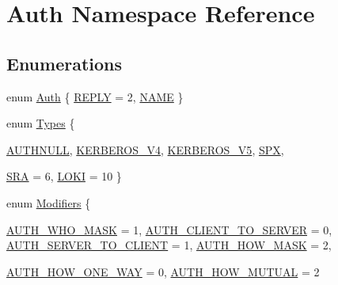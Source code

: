 \hypertarget{namespaceAuth}{
\section{Auth Namespace Reference}
\label{namespaceAuth}
}
\subsection*{Enumerations}
\begin{DoxyCompactItemize}
\item 
enum \hyperlink{namespaceAuth_afd018dc169d551ab60f568415d4921c2}{Auth} \{ \hyperlink{namespaceAuth_afd018dc169d551ab60f568415d4921c2aad7a8ddf26afce2091559ecae21510da}{REPLY} =  2, 
\hyperlink{namespaceAuth_afd018dc169d551ab60f568415d4921c2a3b1ba61eee071c160239eeabad27454e}{NAME}
 \}
\item 
enum \hyperlink{namespaceAuth_a1c36f40c81a9e19a221b5d47e3fbc551}{Types} \{ \par
\hyperlink{namespaceAuth_a1c36f40c81a9e19a221b5d47e3fbc551ad74b9514eeadcd617531bd2691a20bd7}{AUTHNULL}, 
\hyperlink{namespaceAuth_a1c36f40c81a9e19a221b5d47e3fbc551ae26a680fd92093c2b1a800292f1bfb72}{KERBEROS\_\-V4}, 
\hyperlink{namespaceAuth_a1c36f40c81a9e19a221b5d47e3fbc551af86dcb125492557e7dadb2b1495699c4}{KERBEROS\_\-V5}, 
\hyperlink{namespaceAuth_a1c36f40c81a9e19a221b5d47e3fbc551aad89a28d0b5b57b8ae6588c42cc81714}{SPX}, 
\par
\hyperlink{namespaceAuth_a1c36f40c81a9e19a221b5d47e3fbc551a20c2452dafb0603c2def0269060902cc}{SRA} =  6, 
\hyperlink{namespaceAuth_a1c36f40c81a9e19a221b5d47e3fbc551a62e2242bf7aaf7426a03d94d91448b02}{LOKI} =  10
 \}
\item 
enum \hyperlink{namespaceAuth_ad9d52fb54042db8f44db17f33e657f94}{Modifiers} \{ \par
\hyperlink{namespaceAuth_ad9d52fb54042db8f44db17f33e657f94af2e63729a492f22a97719608fd1e5b05}{AUTH\_\-WHO\_\-MASK} =  1, 
\hyperlink{namespaceAuth_ad9d52fb54042db8f44db17f33e657f94a7b330a0f682a0358fe6242de42291994}{AUTH\_\-CLIENT\_\-TO\_\-SERVER} =  0, 
\hyperlink{namespaceAuth_ad9d52fb54042db8f44db17f33e657f94ad80fdb68fce15452e1eaa3e01005b371}{AUTH\_\-SERVER\_\-TO\_\-CLIENT} =  1, 
\hyperlink{namespaceAuth_ad9d52fb54042db8f44db17f33e657f94adcfc0062a9382ab598ae747cf6afebf9}{AUTH\_\-HOW\_\-MASK} =  2, 
\par
\hyperlink{namespaceAuth_ad9d52fb54042db8f44db17f33e657f94a1b39ead6f59662883da8ccde4b708885}{AUTH\_\-HOW\_\-ONE\_\-WAY} =  0, 
\hyperlink{namespaceAuth_ad9d52fb54042db8f44db17f33e657f94a84b52392aa68c813e7d6d451a9ed58b1}{AUTH\_\-HOW\_\-MUTUAL} =  2

\end{DoxyCompactItemize}
